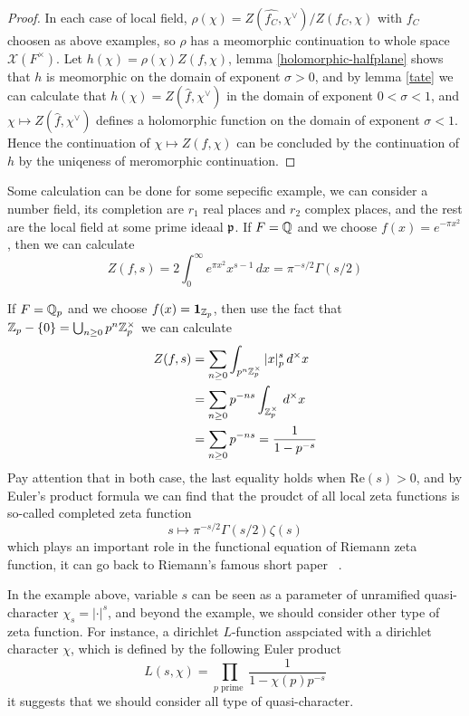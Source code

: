 \begin{proof}
    In each case of local field, \(\rho(\chi) = Z(\hat{f_C},\chi^{\vee})/Z(f_C,\chi)\) with \(f_C\) choosen as above examples, so \(\rho\) has a meomorphic continuation to whole space \(\mathcal{X}(F^\times)\). Let \(h(\chi) = \rho(\chi)Z(f,\chi)\), lemma \ref{holomorphic-halfplane} shows that \(h\) is meomorphic on the domain of exponent \(\sigma > 0\), and by lemma \ref{tate} we can calculate that \(h(\chi) = Z(\hat{f},\chi^\vee)\) in the domain of exponent \(0 < \sigma < 1\), and \(\chi \mapsto Z(\hat{f},\chi^\vee)\) defines a holomorphic function on the domain of exponent \(\sigma < 1\). Hence the continuation of \(\chi \mapsto Z(f,\chi)\) can be concluded by the continuation of \(h\) by the uniqeness of meromorphic continuation.
\end{proof}


\begin{example}
    Some calculation can be done for some sepecific example, we can consider a number field, its completion are \(r_1\) real places and \(r_2\) complex places, and the rest are the local field at some prime ideaal \(\mathfrak{p}\).
    If \(F = \mathbb{Q}\) and we choose \(f(x) = e^{-\pi x^2}\), then we can calculate
    \[Z(f,s) = 2\int_{0}^\infty e^{\pi x^2}x^{s-1} \, dx = \pi^{-s/2}\Gamma(s/2)\]

    If \(F = \mathbb{Q}_p\) and we choose \(f(x) = \mathbf{1}_{\mathbb{Z}_p}\), then use the fact that \(\mathbb{Z}_p-\{0\} = \bigcup_{n\geq 0 } p^n\mathbb{Z}_p^\times\) we can calculate
    \begin{align*}
        Z(f,s) &= \sum_{n \geq 0} \int_{p^n\mathbb{Z}_p^\times} |x|_p^s \, d^\times x \\
        &= \sum_{n \geq 0} p^{-ns} \int_{\mathbb{Z}_p^\times} \, d^\times x \\
        &= \sum_{n \geq 0} p^{-ns} = \frac{1}{1-p^{-s}}
    \end{align*}
    Pay attention that in both case, the last equality holds when \(\mathrm{Re}(s)> 0 \), and by Euler's product formula we can find that the proudct of all local zeta functions is so-called completed zeta function
    \[s \mapsto \pi^{-s/2}\Gamma(s/2) \zeta(s)\]
    which plays an important role in the functional equation of Riemann zeta function, it can go back to Riemann's famous short paper ~\cite{Ri}.
\end{example}

In the example above, variable \(s\) can be seen as a parameter of unramified quasi-character \(\chi_s = |\cdot|^s\), and beyond the example, we should consider other type of zeta function. For instance, a dirichlet \(L\)-function asspciated with a dirichlet character \(\chi\), which is defined by the following Euler product
\[L(s,\chi) = \prod_{p \text{ prime }} \frac{1}{1-\chi(p)p^{-s}}\]
it suggests that we should consider all type of quasi-character.




